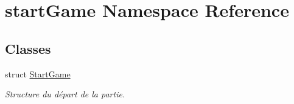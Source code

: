 \hypertarget{namespacestart_game}{}\section{start\+Game Namespace Reference}
\label{namespacestart_game}
\subsection*{Classes}
\begin{DoxyCompactItemize}
\item 
struct \hyperlink{structstart_game_1_1_start_game}{Start\+Game}
\begin{DoxyCompactList}\small\item\em Structure du départ de la partie. \end{DoxyCompactList}\end{DoxyCompactItemize}
